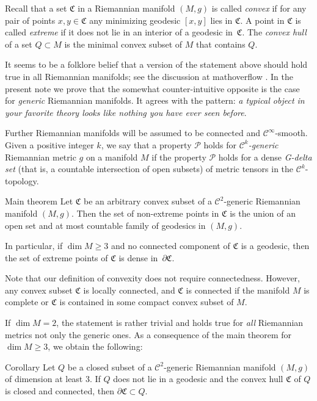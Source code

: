 \documentclass[a4paper,10pt]{article}
\begin{document}
Recall that a set $\mathfrak{C}$ in a Riemannian manifold $(M,g)$ is called \emph{convex} if for any pair of points $x,y\in \mathfrak{C}$ any minimizing geodesic $[x,y]$ lies in $\mathfrak{C}$.
A point in $\mathfrak{C}$ is called \emph{extreme} if it does not lie in an interior of a geodesic in~$\mathfrak{C}$.
The \emph{convex hull} of a set $Q\subset M$ is the minimal convex subset of $M$  that contains $Q$.




It seems to be a folklore belief that a version of the statement above should hold true in all Riemannian manifolds;
see the discussion at mathoverflow \cite{petrunin-2009}.
In the present note we prove that the somewhat counter-intuitive opposite is the case for \emph{generic} Riemannian manifolds.
It agrees with the pattern: \emph{a typical object in your favorite theory looks like nothing you have ever seen before}.

Further Riemannian manifolds will be assumed to be connected and $\mathcal C^\infty$-smooth.
Given a positive integer $k$, we say that a property $\mathcal P$ holds for \emph{$\mathcal C^k$-generic} Riemannian metric $g$ on a manifold $M$ 
if the property $\mathcal P$ holds for a dense \emph{G-delta set} (that is, a countable intersection of open subsets) of metric tensors in the $\mathcal C^k$-topology.

\begin{thm}{Main theorem}\label{thm:main}
Let $\mathfrak C$ be an arbitrary convex subset of a $\mathcal C^2$-generic Riemannian manifold $(M,g)$.
Then the set of non-extreme points in $\mathfrak C$ is the union of an open set and at most countable family of geodesics in $(M,g)$. 

In particular, if $\dim M\ge 3$ and no connected component of $\mathfrak C$ is  a geodesic, then the set of
extreme points of $\mathfrak{C}$ is dense in~$\partial\mathfrak{C}$.
\end{thm}

Note that our definition of convexity does not require connectedness. However, any convex subset $\mathfrak C$ is locally connected, and $\mathfrak C$  is 
connected if the manifold $M$ is complete or $\mathfrak C$ is contained  in some compact convex subset of $M$.

If $\dim M =2$, the statement is rather trivial and holds true for \emph{all} Riemannian metrics not only the generic ones.
As a consequence  of the main theorem for $\dim M \geq 3$, we obtain the following:

\begin{thm}{Corollary}\label{cor:caratheodory}
Let $Q$ be a closed subset of a $\mathcal C^2$-generic Riemannian manifold $(M,g)$ of dimension at least $3$. If $Q$ does not lie in a  geodesic and
the convex hull $\mathfrak C$ of $Q$ is closed and connected, then $\partial \mathfrak C \subset Q$.
\end{thm}
\end{document}
